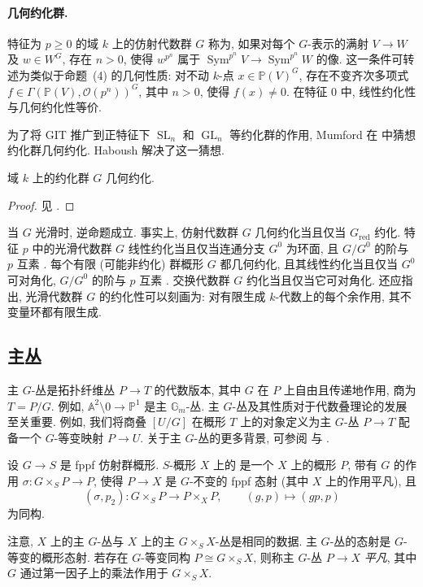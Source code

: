 \paragraph{几何约化群.}
特征为 $p\ge0$ 的域 $k$ 上的仿射代数群 $G$ 称为, 如果对每个 $G$-表示的满射 $V\to W$ 及 $w\in W^G$, 存在 $n>0$, 使得 $w^{p^n}$ 属于 $\operatorname{Sym}^{p^n}V\to\operatorname{Sym}^{p^n}W$ 的像. 这一条件可转述为类似于命题~(4) 的几何性质: 对不动 $k$-点 $x\in\mathbb P(V)^G$, 存在不变齐次多项式 $f\in\Gamma(\mathbb P(V),\mathcal O(p^n))^G$, 其中 $n>0$, 使得 $f(x)\ne0$. 在特征 $0$ 中, 线性约化性与几何约化性等价.

为了将 GIT 推广到正特征下 $\operatorname{SL}_n$ 和 $\operatorname{GL}_n$ 等约化群的作用, Mumford 在 \cite[前言]{GIT} 中猜想约化群几何约化. Haboush 解决了这一猜想.
\begin{theorem}[Haboush 定理]\label{src:B.1.49}
域 $k$ 上的约化群 $G$ 几何约化.
\end{theorem}
\begin{proof}
见 \cite{Hab75,SS11}.
\end{proof}
当 $G$ 光滑时, 逆命题成立. 事实上, 仿射代数群 $G$ 几何约化当且仅当 $G_{\mathrm{red}}$ 约化. 特征 $p$ 中的光滑代数群 $G$ 线性约化当且仅当连通分支 $G^0$ 为环面, 且 $G/G^0$ 的阶与 $p$ 互素 \cite{Nag62}. 每个有限 (可能非约化) 群概形 $G$ 都几何约化, 且其线性约化当且仅当 $G^0$ 可对角化, $G/G^0$ 的阶与 $p$ 互素 \cite[定理 $1.2$]{HR15}. 交换代数群 $G$ 约化当且仅当它可对角化. 还应指出, 光滑代数群 $G$ 的约化性可以刻画为: 对有限生成 $k$-代数上的每个余作用, 其不变量环都有限生成.

\subsection{主丛}\label{src:B.1.7-subsection}
主 $G$-丛是拓扑纤维丛 $P\to T$ 的代数版本, 其中 $G$ 在 $P$ 上自由且传递地作用, 商为 $T=P/G$. 例如, $\mathbb A^2\setminus0\to\mathbb P^1$ 是主 $\mathbb G_m$-丛. 主 $G$-丛及其性质对于代数叠理论的发展至关重要. 例如, 我们将商叠 $[U/G]$ 在概形 $T$ 上的对象定义为主 $G$-丛 $P\to T$ 配备一个 $G$-等变映射 $P\to U$. 关于主 $G$-丛的更多背景, 可参阅 \cite[\S$5.12$]{Poo17} 与 \cite{Bal09}.
\newpage
\begin{samepage}
\begin{definition}\label{src:B.1.50}
设 $G\to S$ 是 fppf 仿射群概形. $S$-概形 $X$ 上的 是一个 $X$ 上的概形 $P$, 带有 $G$ 的作用 $\sigma:G\times_S P\to P$, 使得 $P\to X$ 是 $G$-不变的 fppf 态射 (其中 $X$ 上的作用平凡), 且
\[
(\sigma,p_2):G\times_S P\to P\times_X P,\qquad(g,p)\mapsto(gp,p)
\]
为同构.
\end{definition}
\end{samepage}
注意, $X$ 上的主 $G$-丛与 $X$ 上的主 $G\times_S X$-丛是相同的数据. 主 $G$-丛的态射是 $G$-等变的概形态射. 若存在 $G$-等变同构 $P\cong G\times_S X$, 则称主 $G$-丛 $P\to X$ \textit{平凡}, 其中 $G$ 通过第一因子上的乘法作用于 $G\times_S X$.

